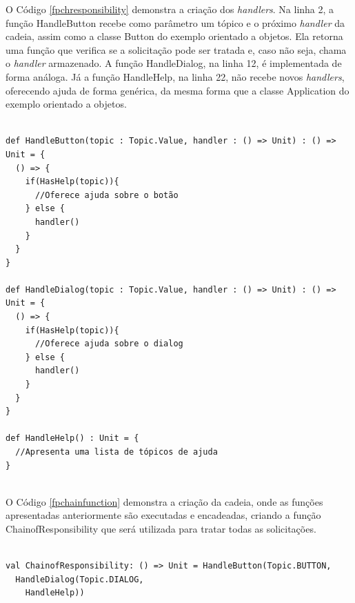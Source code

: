 O Código \ref{fpchresponsibility} demonstra a 
criação dos \textit{handlers}. Na linha 2, a 
função HandleButton recebe como parâmetro um 
tópico e o próximo \textit{handler} da cadeia, 
assim como a classe Button do exemplo orientado 
a objetos. Ela retorna uma função que verifica 
se a solicitação pode ser tratada e, caso 
não seja, chama o \textit{handler} armazenado. 
A função HandleDialog, na linha 12, é 
implementada de forma análoga. Já a função 
HandleHelp, na linha 22, não recebe novos 
\textit{handlers}, oferecendo ajuda de forma 
genérica, da mesma forma que a classe 
Application do exemplo orientado a objetos.

\begin{lstlisting}[caption={Chain of Responsibility Funcional.},label=fpchresponsibility]
    
def HandleButton(topic : Topic.Value, handler : () => Unit) : () => Unit = {
  () => {
    if(HasHelp(topic)){
      //Oferece ajuda sobre o botão
    } else {
      handler()
    }
  }
}

def HandleDialog(topic : Topic.Value, handler : () => Unit) : () => Unit = {
  () => {
    if(HasHelp(topic)){
      //Oferece ajuda sobre o dialog
    } else {
      handler()
    }
  }
}

def HandleHelp() : Unit = {
  //Apresenta uma lista de tópicos de ajuda
}
    
\end{lstlisting}

O Código \ref{fpchainfunction} demonstra a criação 
da cadeia, onde as funções apresentadas anteriormente 
são executadas e encadeadas, criando a função 
ChainofResponsibility que será utilizada para 
tratar todas as solicitações.

\begin{lstlisting}[caption={Função Chain of Responsability.},label=fpchainfunction]
    
val ChainofResponsibility: () => Unit = HandleButton(Topic.BUTTON,
  HandleDialog(Topic.DIALOG,
    HandleHelp))
      
\end{lstlisting}